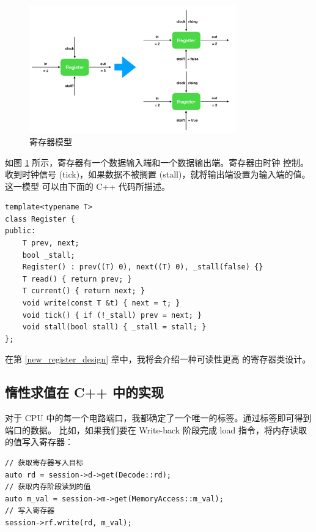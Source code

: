 \documentclass[12pt]{article}
\begin{document}
    \begin{figure}[h]
        \centering
        \includegraphics[width=0.8\textwidth]{register}
        \caption{寄存器模型}
        \label{fig:register}
    \end{figure}

    如图 \ref{fig:register} 所示，寄存器有一个数据输入端和一个数据输出端。寄存器由时钟
    控制。收到时钟信号 (tick)，如果数据不被搁置 (stall)，就将输出端设置为输入端的值。这一模型
    可以由下面的 C++ 代码所描述。

    \begin{verbatim}
template<typename T>
class Register {
public:
    T prev, next;
    bool _stall;
    Register() : prev((T) 0), next((T) 0), _stall(false) {}
    T read() { return prev; }
    T current() { return next; }
    void write(const T &t) { next = t; }
    void tick() { if (!_stall) prev = next; }
    void stall(bool stall) { _stall = stall; }
};
    \end{verbatim}
    \begin{tcolorbox}
        在第 \ref{new_register_design} 章中，我将会介绍一种可读性更高
        的寄存器类设计。
    \end{tcolorbox}

    \subsection{惰性求值在 C++ 中的实现}

    对于 CPU 中的每一个电路端口，我都确定了一个唯一的标签。通过标签即可得到端口的数据。
    比如，如果我们要在 Write-back 阶段完成 load 指令，将内存读取的值写入寄存器：
    
    \begin{verbatim}
// 获取寄存器写入目标
auto rd = session->d->get(Decode::rd);
// 获取内存阶段读到的值
auto m_val = session->m->get(MemoryAccess::m_val);
// 写入寄存器
session->rf.write(rd, m_val);
    \end{verbatim}
\end{document}
